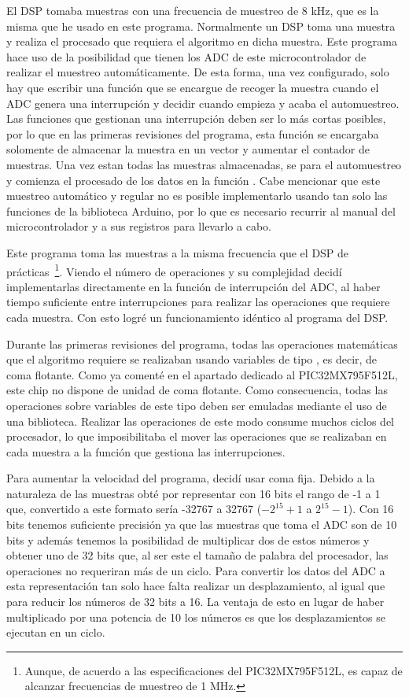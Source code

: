 El DSP tomaba muestras con una frecuencia de muestreo de 8 kHz, que es la misma que he usado en este programa. Normalmente un DSP toma una muestra y realiza el procesado que requiera el algoritmo en dicha muestra. Este programa hace uso de la posibilidad que tienen los ADC de este microcontrolador de realizar el muestreo automáticamente. De esta forma, una vez configurado, solo hay que escribir una función que se encargue de recoger la muestra cuando el ADC genera una interrupción y decidir cuando empieza y acaba el automuestreo. Las funciones que gestionan una interrupción deben ser lo más cortas posibles, por lo que en las primeras revisiones del programa, esta función se encargaba solomente de almacenar la muestra en un vector y aumentar el contador de muestras. Una vez estan todas las muestras almacenadas, se para el automuestreo y comienza el procesado de los datos en la función . Cabe mencionar que este muestreo automático y regular no es posible implementarlo usando tan solo las funciones de la biblioteca Arduino, por lo que es necesario recurrir al manual del microcontrolador y a sus registros para llevarlo a cabo.

Este programa toma las muestras a la misma frecuencia que el DSP de prácticas~\footnote{Aunque, de acuerdo a las especificaciones del PIC32MX795F512L, es capaz de alcanzar frecuencias de muestreo de 1 MHz.}. Viendo el número de operaciones y su complejidad decidí implementarlas directamente en la función de interrupción del ADC, al haber tiempo suficiente entre interrupciones para realizar las operaciones que requiere cada muestra. Con esto logré un funcionamiento idéntico al programa del DSP.\@

Durante las primeras revisiones del programa, todas las operaciones matemáticas que el algoritmo requiere se realizaban usando variables de tipo , es decir, de coma flotante. Como ya comenté en el apartado dedicado al PIC32MX795F512L, este chip no dispone de unidad de coma flotante. Como consecuencia, todas las operaciones sobre variables de este tipo deben ser emuladas mediante el uso de una biblioteca. Realizar las operaciones de este modo consume muchos ciclos del procesador, lo que imposibilitaba el mover las operaciones que se realizaban en cada muestra a la función que gestiona las interrupciones.

Para aumentar la velocidad del programa, decidí usar coma fija. Debido a la naturaleza de las muestras obté por representar con 16 bits el rango de -1 a 1 que, convertido a este formato sería -32767 a 32767 (\(-2^{15}+1\) a \(2^{15}-1\)). Con 16 bits tenemos suficiente precisión ya que las muestras que toma el ADC son de 10 bits y además tenemos la posibilidad de multiplicar dos de estos números y obtener uno de 32 bits que, al ser este el tamaño de palabra del procesador, las operaciones no requeriran más de un ciclo. Para convertir los datos del ADC a esta representación tan solo hace falta realizar un desplazamiento, al igual que para reducir los números de 32 bits a 16. La ventaja de esto en lugar de haber multiplicado por una potencia de 10 los números es que los desplazamientos se ejecutan en un ciclo.



